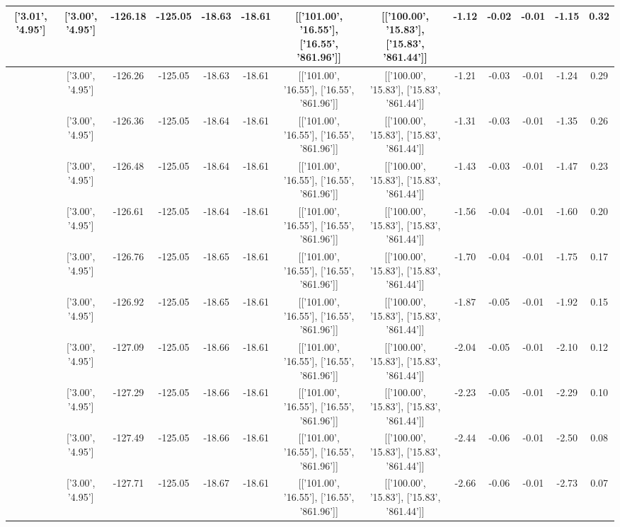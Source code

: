 \begin{table}[htbp]
\begin{adjustbox}{angle=90}
\begin{tabular}{|c|c|c|c|c|c|c|c|c|c|c|c|c|}
 ['3.01', '4.95'] & ['3.00', '4.95'] & -126.18 & -125.05 & -18.63 & -18.61 & [['101.00', '16.55'], ['16.55', '861.96']] & [['100.00', '15.83'], ['15.83', '861.44']] & -1.12 & -0.02 & -0.01 & -1.15 & 0.32\\ \hline
 ['3.01', '4.95'] & ['3.00', '4.95'] & -126.26 & -125.05 & -18.63 & -18.61 & [['101.00', '16.55'], ['16.55', '861.96']] & [['100.00', '15.83'], ['15.83', '861.44']] & -1.21 & -0.03 & -0.01 & -1.24 & 0.29\\ \hline
 ['3.01', '4.95'] & ['3.00', '4.95'] & -126.36 & -125.05 & -18.64 & -18.61 & [['101.00', '16.55'], ['16.55', '861.96']] & [['100.00', '15.83'], ['15.83', '861.44']] & -1.31 & -0.03 & -0.01 & -1.35 & 0.26\\ \hline
 ['3.01', '4.95'] & ['3.00', '4.95'] & -126.48 & -125.05 & -18.64 & -18.61 & [['101.00', '16.55'], ['16.55', '861.96']] & [['100.00', '15.83'], ['15.83', '861.44']] & -1.43 & -0.03 & -0.01 & -1.47 & 0.23\\ \hline
 ['3.01', '4.95'] & ['3.00', '4.95'] & -126.61 & -125.05 & -18.64 & -18.61 & [['101.00', '16.55'], ['16.55', '861.96']] & [['100.00', '15.83'], ['15.83', '861.44']] & -1.56 & -0.04 & -0.01 & -1.60 & 0.20\\ \hline
 ['3.01', '4.95'] & ['3.00', '4.95'] & -126.76 & -125.05 & -18.65 & -18.61 & [['101.00', '16.55'], ['16.55', '861.96']] & [['100.00', '15.83'], ['15.83', '861.44']] & -1.70 & -0.04 & -0.01 & -1.75 & 0.17\\ \hline
 ['3.01', '4.95'] & ['3.00', '4.95'] & -126.92 & -125.05 & -18.65 & -18.61 & [['101.00', '16.55'], ['16.55', '861.96']] & [['100.00', '15.83'], ['15.83', '861.44']] & -1.87 & -0.05 & -0.01 & -1.92 & 0.15\\ \hline
 ['3.01', '4.95'] & ['3.00', '4.95'] & -127.09 & -125.05 & -18.66 & -18.61 & [['101.00', '16.55'], ['16.55', '861.96']] & [['100.00', '15.83'], ['15.83', '861.44']] & -2.04 & -0.05 & -0.01 & -2.10 & 0.12\\ \hline
 ['3.02', '4.95'] & ['3.00', '4.95'] & -127.29 & -125.05 & -18.66 & -18.61 & [['101.00', '16.55'], ['16.55', '861.96']] & [['100.00', '15.83'], ['15.83', '861.44']] & -2.23 & -0.05 & -0.01 & -2.29 & 0.10\\ \hline
 ['3.02', '4.95'] & ['3.00', '4.95'] & -127.49 & -125.05 & -18.66 & -18.61 & [['101.00', '16.55'], ['16.55', '861.96']] & [['100.00', '15.83'], ['15.83', '861.44']] & -2.44 & -0.06 & -0.01 & -2.50 & 0.08\\ \hline
 ['3.02', '4.96'] & ['3.00', '4.95'] & -127.71 & -125.05 & -18.67 & -18.61 & [['101.00', '16.55'], ['16.55', '861.96']] & [['100.00', '15.83'], ['15.83', '861.44']] & -2.66 & -0.06 & -0.01 & -2.73 & 0.07\\ \hline

\end{tabular}
\end{adjustbox}
\end{table}
